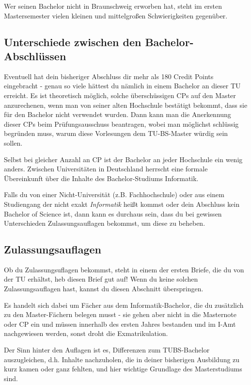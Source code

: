 \begin{multicols}{2}
	Wer seinen Bachelor nicht in Braunschweig erworben hat, steht im ersten Mastersemester vielen kleinen und mittelgroßen Schwierigkeiten gegenüber.

	\subsection{Unterschiede zwischen den Bachelor-Abschlüssen}
		Eventuell hat dein bisheriger Abschluss dir mehr als 180 Credit Points eingebracht - genau so viele hättest du nämlich in einem Bachelor an dieser TU erreicht. Es ist theoretisch möglich, solche überschüssigen CPs auf den Master anzurechenen, wenn man von seiner alten Hochschule bestätigt bekommt, dass sie für den Bachelor nicht verwendet wurden. Dann kann man die Anerkennung dieser CPs beim Prüfungsausschuss beantragen, wobei man möglichst schlüssig begründen muss, warum diese Vorlesungen dem TU-BS-Master würdig sein sollen.

		Selbst bei gleicher Anzahl an CP ist der Bachelor an jeder Hochschule ein wenig anders. Zwischen Universitäten in Deutschland herrscht eine formale Übereinkunft über die Inhalte des Bachelor-Studiums Informatik. 

		Falls du von einer Nicht-Universität (z.B. Fachhochschule) oder aus einem Studiengang der nicht exakt \emph{Informatik} heißt kommst oder dein Abschluss kein Bachelor of Science ist, dann kann es durchaus sein, dass du bei gewissen Unterschieden Zulassungsauflagen bekommst, um diese zu beheben.

	\subsection{Zulassungsauflagen}
	\label{auflagen}
	Ob du Zulassungsuflagen bekommst, steht in einem der ersten Briefe, die du von der TU erhältst, heb diesen Brief gut auf! Wenn du keine solchen Zulassungsauflagen hast, kannst du diesen Abschnitt überspringen.

	Es handelt sich dabei um Fächer aus dem Informatik-Bachelor, die du zusätzlich zu den Master-Fächern belegen musst - sie gehen aber nicht in die Masternote oder CP ein und müssen innerhalb des ersten Jahres bestanden und im I-Amt nachgewiesen werden, sonst droht die Exmatrikulation.

	Der Sinn hinter den Auflagen ist es, Differenzen zum TUBS-Bachelor auszugleichen, d.h. Inhalte nachzuholen, die in deiner bisherigen Ausbildung zu kurz kamen oder ganz fehlten, und hier wichtige Grundlage des Masterstudiums sind.


\end{multicols}
